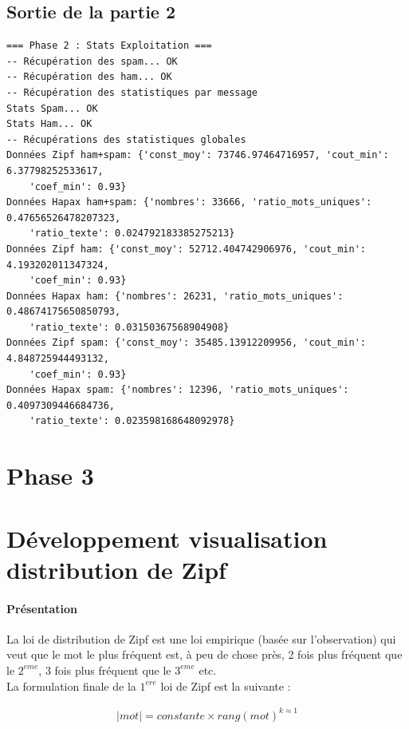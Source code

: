 \documentclass[a4paper,12pt]{article}
\begin{document}
	\subsection{Sortie de la partie 2}
		\begin{verbatim}
=== Phase 2 : Stats Exploitation ===
-- Récupération des spam... OK
-- Récupération des ham... OK
-- Récupération des statistiques par message
Stats Spam... OK
Stats Ham... OK
-- Récupérations des statistiques globales
Données Zipf ham+spam: {'const_moy': 73746.97464716957, 'cout_min': 6.37798252533617, 
	'coef_min': 0.93}
Données Hapax ham+spam: {'nombres': 33666, 'ratio_mots_uniques': 0.47656526478207323, 
	'ratio_texte': 0.024792183385275213}
Données Zipf ham: {'const_moy': 52712.404742906976, 'cout_min': 4.193202011347324, 
	'coef_min': 0.93}
Données Hapax ham: {'nombres': 26231, 'ratio_mots_uniques': 0.48674175650850793, 
	'ratio_texte': 0.03150367568904908}
Données Zipf spam: {'const_moy': 35485.13912209956, 'cout_min': 4.848725944493132, 
	'coef_min': 0.93}
Données Hapax spam: {'nombres': 12396, 'ratio_mots_uniques': 0.4097309446684736, 
	'ratio_texte': 0.023598168648092978}
		\end{verbatim}

\newpage
\section{Phase 3}




\newpage	
\appendix
\section{Développement visualisation distribution de Zipf}
	\label{sec:devZipf}
	\paragraph{Présentation}
		La loi de distribution de Zipf est une loi empirique (basée sur l'observation) qui veut que le mot le plus fréquent est, à peu de chose près, 2 fois plus fréquent que le $2^{eme}$, 3 fois plus fréquent que le $3^{eme}$ etc.\\
		
		La formulation finale de la $1^{ere}$ loi de Zipf est la suivante :
		
		\begin{align*}
				|mot| = constante \times rang(mot)^{k \approx 1}
		\end{align*}
		
\end{document}
